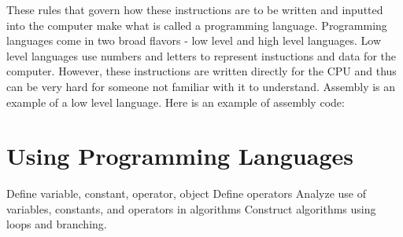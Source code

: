 These rules that govern how these instructions are to be written and inputted into the computer make what is called a programming language. Programming languages come in two broad flavors - low level and high level languages. Low level languages use numbers and letters to represent instuctions and data for the computer. However, these instructions are written directly for the CPU and thus can be very hard for someone not familiar with it to understand. Assembly is an example of a low level language. Here is an example of assembly code:




\section{Using Programming Languages}

Define variable, constant, operator, object
Define operators
Analyze use of variables, constants, and operators in algorithms
Construct algorithms using loops and branching.

